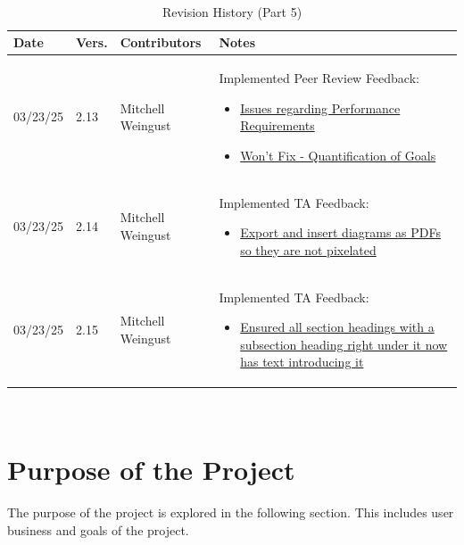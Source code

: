 \documentclass[12pt]{article}
\begin{document}
~\newpage
\begin{table}[H]
  \centering
  \caption{Revision History (Part 5)}
  \label{TblRevisionHistoryPart1}
  \begin{tabularx}{\textwidth}{p{1.5cm} p{1cm} p{3.5cm} X}
      \toprule
      \textbf{Date} & \textbf{Vers.} & \textbf{Contributors} & \textbf{Notes} \\
      \midrule
      03/23/25 & 2.13 & Mitchell Weingust & Implemented Peer Review Feedback:
      \begin{itemize}[leftmargin=*]
        \item \href{https://github.com/parishanizam/TeleHealth/issues/116}{Issues regarding Performance Requirements}
        \item \href{https://github.com/parishanizam/TeleHealth/issues/118}{Won't Fix - Quantification of Goals}
      \end{itemize} \\
      03/23/25 & 2.14 & Mitchell Weingust & Implemented TA Feedback: 
      \begin{itemize}[leftmargin=*]
        \item \href{https://github.com/parishanizam/TeleHealth/issues/190}{Export and insert diagrams as PDFs so they are not pixelated}
      \end{itemize} \\
      03/23/25 & 2.15 & Mitchell Weingust & Implemented TA Feedback: 
      \begin{itemize}[leftmargin=*]
        \item \href{https://github.com/parishanizam/TeleHealth/issues/191}{Ensured all section headings with a subsection heading right under it now has text introducing it}
      \end{itemize} \\
    \end{tabularx}
  \end{table}

~\newpage
{}

\section{Purpose of the Project}

\noindent\hspace{2em}The purpose of the project is explored in the following section. This includes
user business and goals of the project.
\end{document}
